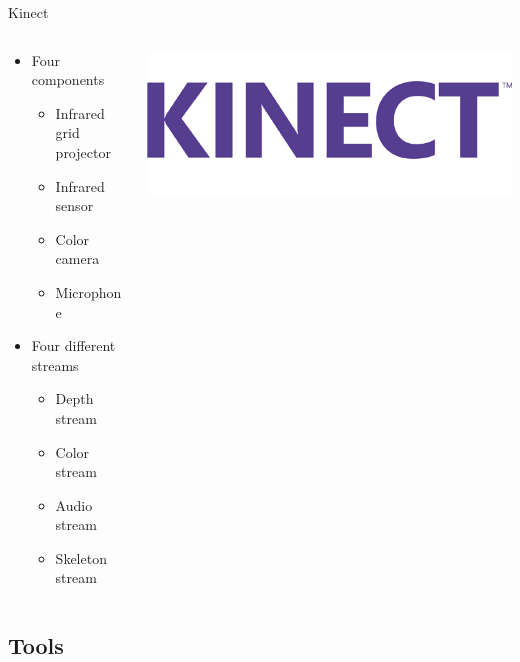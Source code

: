 \documentclass{beamer}
\begin{document}
\begin{frame}{Kinect}
\begin{columns}[T]
    \begin{column}{.5\textwidth}
 \begin{itemize}
  \item Four components
   \begin{itemize}
    \item Infrared grid projector
    \item Infrared sensor
    \item Color camera
    \item Microphone
   \end{itemize}
  \item Four different streams
  \begin{itemize}
   \item Depth stream
   \item Color stream
   \item Audio stream
   \end{itemize}
   \begin{itemize}
   \item Skeleton stream
    \end{itemize}
 \end{itemize}
    \end{column}
    \begin{column}{.5\textwidth}  
    \includegraphics[scale=0.25]{kinect.png}
    \end{column}
  \end{columns}
\end{frame}

\subsection{Tools}
\end{document}
